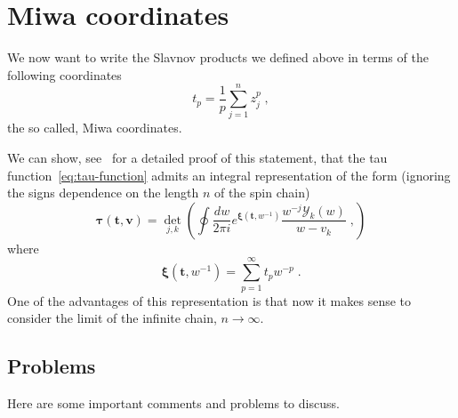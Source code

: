 \documentclass[a4paper,11pt]{amsart}
\begin{document}

\section{Miwa coordinates}

We now want to write the Slavnov products we defined above in terms of the following 
coordinates
\begin{equation}
  t_p = \frac{1}{p}\sum_{j=1}^n z_j^p\; ,
\end{equation}
the so called, Miwa coordinates.

We can show, see~\cite{Araujo:2021ghu} for a detailed proof of this
statement, that the tau function~\ref{eq:tau-function} admits an
integral representation of the form (ignoring the signs dependence on
the length \(n\) of the spin chain)
\begin{equation}
  \label{eq:tau-function-miwa}
  \bm{\tau}(\bm{t}, \bm{v}) = 
    \det_{j,k}\left(
    \oint \frac{d w}{2\pi i} e^{\bm{\xi}(\bm{t}, w^{-1})} \frac{w^{-j}\mathcal{Y}_k(w)}{w - v_k} \; ,
    \right)
\end{equation}
where 
\begin{equation}
  \bm{\xi}(\bm{t}, w^{-1}) = \sum_{p=1}^\infty t_p w^{-p}\; .
\end{equation}
One of the advantages of this representation is that now it makes
sense to consider the limit of the infinite chain, \(n\to \infty\).










\subsection{Problems}
Here are some important comments and problems to discuss. 
\end{document}
